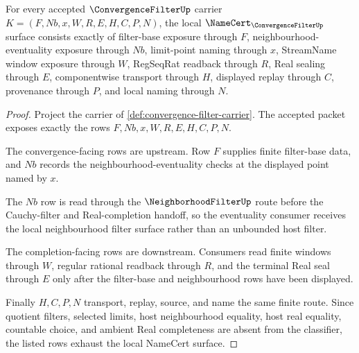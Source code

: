 \begin{theorem}\label{thm:convergence-filter-namecert-obligations}
For every accepted $\ConvergenceFilterUp$ carrier $K=(F,Nb,x,W,R,E,H,C,P,N)$, the local $\NameCert_{\ConvergenceFilterUp}$ surface consists exactly of filter-base exposure through $F$, neighbourhood-eventuality exposure through $Nb$, limit-point naming through $x$, StreamName window exposure through $W$, RegSeqRat readback through $R$, Real sealing through $E$, componentwise transport through $H$, displayed replay through $C$, provenance through $P$, and local naming through $N$.
\end{theorem}
\begin{proof}
Project the carrier of \autoref{def:convergence-filter-carrier}. The accepted packet exposes exactly the rows $F,Nb,x,W,R,E,H,C,P,N$.

The convergence-facing rows are upstream. Row $F$ supplies finite filter-base data, and $Nb$ records the neighbourhood-eventuality checks at the displayed point named by $x$.

The $Nb$ row is read through the $\NeighborhoodFilterUp$ route before the Cauchy-filter and Real-completion handoff, so the eventuality consumer receives the local neighbourhood filter surface rather than an unbounded host filter.

The completion-facing rows are downstream. Consumers read finite windows through $W$, regular rational readback through $R$, and the terminal Real seal through $E$ only after the filter-base and neighbourhood rows have been displayed.

Finally $H,C,P,N$ transport, replay, source, and name the same finite route. Since quotient filters, selected limits, host neighbourhood equality, host real equality, countable choice, and ambient Real completeness are absent from the classifier, the listed rows exhaust the local NameCert surface.
\end{proof}

